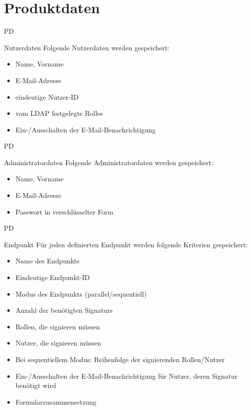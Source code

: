 \section{Produktdaten}
\label{sec:data}
\setcounter{counter}{10}
\begin{Kriterien}{PD}
\item[\gls{Nutzer}daten] Folgende Nutzerdaten werden gespeichert:
\end{Kriterien}
\vspace{-10pt}
\begin{itemize}\itemsep-10pt
\item Name, Vorname
\item E-Mail-Adresse
\item eindeutige Nutzer-ID
\item vom \gls{LDAP} festgelegte \glspl{Rolle}
\item Ein-/Ausschalten der E-Mail-Benachrichtigung
\end{itemize}


\begin{Kriterien}{PD}
\item[\gls{Administrator}daten] Folgende Administratordaten werden gespeichert:
\end{Kriterien}
\vspace{-10pt}
\begin{itemize}\itemsep-10pt
\item Name, Vorname
\item E-Mail-Adresse
\item Passwort in verschlüsselter Form
\end{itemize}


\begin{Kriterien}{PD}
\item[\gls{Endpunkt}] Für jeden definierten Endpunkt werden folgende Kriterien gespeichert:
\end{Kriterien}
\vspace{-10pt}
\begin{itemize}\itemsep-10pt
\item Name des Endpunkts
\item Eindeutige Endpunkt-ID
\item \gls{Modus} des Endpunkts (parallel/sequentiell)
\item Anzahl der benötigten \glspl{Signatur}
\item Rollen, die signieren müssen
\item Nutzer, die signieren müssen
\item Bei sequentiellem Modus: Reihenfolge der signierenden Rollen/Nutzer
\item Ein-/Ausschalten der E-Mail-Benachrichtigung für Nutzer, deren Signatur benötigt wird
\item \gls{Formular}zusammensetzung
\end{itemize}

